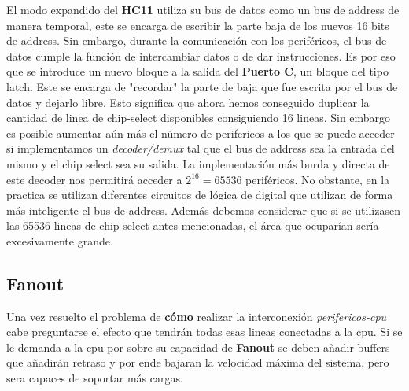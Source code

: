  El modo expandido del \textbf{HC11} utiliza su bus de datos como un bus de address de manera temporal, este se encarga de escribir la parte baja de los nuevos 16 bits de address. Sin embargo, durante la comunicación con los periféricos, el bus de datos cumple la función de intercambiar datos o de dar instrucciones. Es por eso que se introduce un nuevo bloque a la salida del \textbf{Puerto C}, un bloque del tipo latch. Este se encarga de "recordar" la parte de baja que fue escrita por el bus de datos y dejarlo libre.
 Esto significa que ahora hemos conseguido duplicar la cantidad de linea de chip-select disponibles consiguiendo 16 lineas. 
 Sin embargo es posible aumentar aún más el número de perifericos a los que se puede acceder si implementamos un \textit{decoder/demux} tal que el bus de address sea la entrada del mismo y el chip select sea su salida. La implementación más burda y directa de este decoder nos permitirá acceder a $2^16 = 65536$ periféricos. No obstante, en la practica se utilizan diferentes circuitos de lógica de digital que utilizan de forma más inteligente el bus de address. Además debemos considerar que si se utilizasen las 65536 lineas de chip-select antes mencionadas, el área que ocuparían sería excesivamente grande.
 
\subsection{Fanout}
Una vez resuelto el problema de \textbf{cómo} realizar la interconexión \textit{perifericos-cpu} cabe preguntarse el efecto que tendrán todas esas lineas conectadas a la cpu. Si se le demanda a la cpu por sobre su capacidad de \textbf{Fanout} se deben añadir buffers que añadirán retraso y por ende bajaran la velocidad máxima del sistema, pero sera capaces de soportar más cargas.
